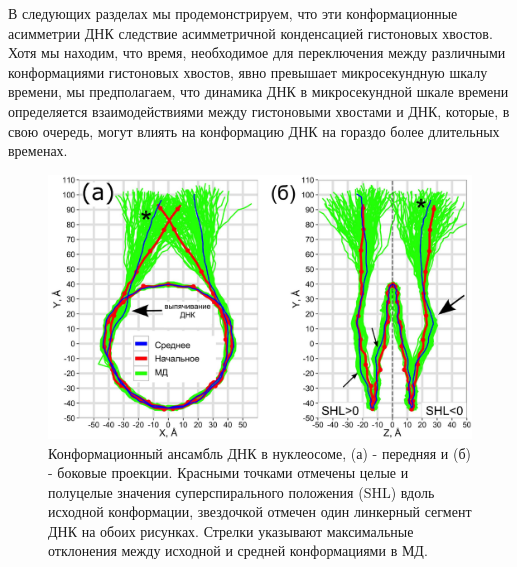     В следующих разделах мы продемонстрируем, что эти конформационные асимметрии ДНК следствие асимметричной конденсацией гистоновых хвостов. Хотя мы находим, что время, необходимое для переключения между различными конформациями гистоновых хвостов, явно превышает микросекундную шкалу времени, мы предполагаем, что динамика ДНК в микросекундной шкале времени определяется взаимодействиями между гистоновыми хвостами и ДНК, которые, в свою очередь, могут влиять на конформацию ДНК на гораздо более длительных временах.

\begin{figure} [H]
    \centering
    \includegraphics[width=\textwidth]{images/p2/jmb/part2_2_f3.pdf}
    \caption[Конформационный ансамбль ДНК в нуклеосоме]{Конформационный ансамбль ДНК в нуклеосоме, (а) - передняя и (б) - боковые проекции. Красными точками отмечены целые и полуцелые значения суперспирального положения (SHL) вдоль исходной конформации, звездочкой отмечен один линкерный сегмент ДНК на обоих рисунках. Стрелки указывают максимальные отклонения между исходной и средней конформациями в МД.}
    \label{fig:p2_2_f3}
\end{figure}

